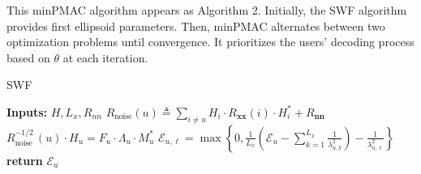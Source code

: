 

This minPMAC algorithm appears as Algorithm 2.  Initially, the SWF algorithm provides first ellipsoid parameters. Then, minPMAC alternates between two optimization problems until convergence. It prioritizes the users' decoding process based on $\theta$ at each iteration.

        



\begin{algorithm}[t]
	\caption{SWF} 
    \State \textbf{Inputs:} $H, L_x, R_{nn}$
            \State $R_{\text {noise}}(u) \triangleq \sum_{i \neq u} H_i \cdot R_{\boldsymbol{x} \boldsymbol{x}}(i) \cdot H_i^*+R_{\boldsymbol{nn}}$
            \vspace{0.1cm}\State $R_{\text {noise }}^{-1 / 2}(u) \cdot H_u=F_u \cdot \Lambda_u \cdot M_u^*$
            \vspace{0.1cm}
                \State $\mathcal{E}_{u,\ell} = \operatorname{max} \left\{0, {\frac{1}{L_x}}\left(\mathcal{E}_u - \sum_{k=1}^{L_x}\frac{1}{\lambda_{u,k}^2}\right) - \frac{1}{\lambda_{u,\ell}^2}\right\}$
            \vspace{0.1cm}\EndFor
		\EndFor
\State \textbf{return} $\mathcal{E}_u$
\end{algorithm}

